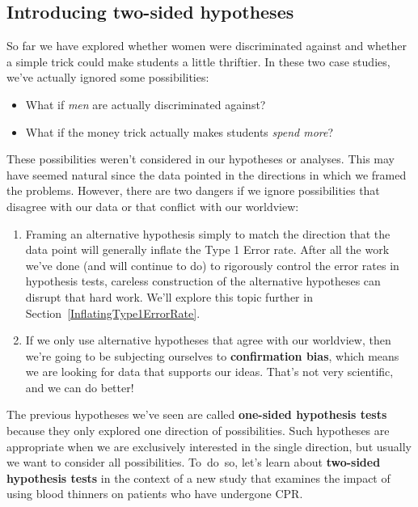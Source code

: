 \subsection{Introducing two-sided hypotheses}
\label{IntroducingTwoSidedHypotheses}


So far we have explored whether women were discriminated against and whether a simple trick could make students a little thriftier. In these two case studies, we've actually ignored some possibilities:
\begin{itemize}
\item What if \emph{men} are actually discriminated against?
\item What if the money trick actually makes students \emph{spend more}?
\end{itemize}
These possibilities weren't considered in our hypotheses or analyses. This may have seemed natural since the data pointed in the directions in which we framed the problems. However, there are two dangers if we ignore possibilities that disagree with our data or that conflict with our worldview:
\begin{enumerate}
\item Framing an alternative hypothesis simply to match the direction that the data point will generally inflate the Type 1 Error rate. After all the work we've done (and will continue to do) to rigorously control the error rates in hypothesis tests, careless construction of the alternative hypotheses can disrupt that hard work. We'll explore this topic further in Section~\ref{InflatingType1ErrorRate}.
\item If we only use alternative hypotheses that agree with our worldview, then we're going to be subjecting ourselves to \textbf{confirmation bias}, which means we are looking for data that supports our ideas. That's not very scientific, and we can do better!
\end{enumerate}
The previous hypotheses we've seen are called \textbf{one-sided hypothesis tests} because they only explored one direction of possibilities. Such hypotheses are appropriate when we are exclusively interested in the single direction, but usually we want to consider all possibilities. To~do~so, let's learn about \textbf{two-sided hypothesis tests} in the context of a new study that examines the impact of using blood thinners on patients who have undergone CPR.

